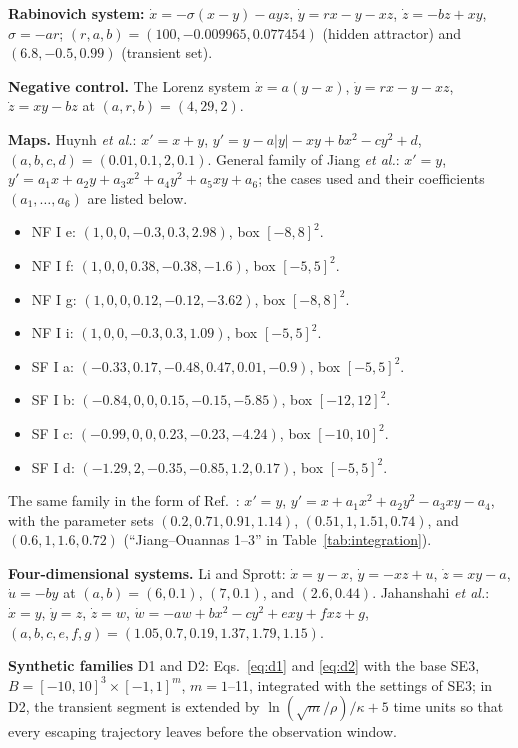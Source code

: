 \textbf{Rabinovich system:}\cite{Kuznetsov2018Rabinovich} $\dot x=-\sigma(x-y)-ayz$, $\dot y=rx-y-xz$, $\dot z=-bz+xy$, $\sigma=-ar$; $(r,a,b)=(100,-0.009965,0.077454)$ (hidden attractor) and $(6.8,-0.5,0.99)$ (transient set\cite{SprottMunmuangsaen2018Comment}).

\textbf{Negative control.} The Lorenz system $\dot x=a(y-x)$, $\dot y=rx-y-xz$, $\dot z=xy-bz$ at $(a,r,b)=(4,29,2)$.

\textbf{Maps.} Huynh \textit{et al.}:\cite{Huynh2019} $x'=x+y$, $y'=y-a|y|-xy+bx^2-cy^2+d$, $(a,b,c,d)=(0.01,0.1,2,0.1)$. General family of Jiang \textit{et al.}:\cite{Jiang2016Maps} $x'=y$, $y'=a_1x+a_2y+a_3x^2+a_4y^2+a_5xy+a_6$; the cases used and their coefficients $(a_1,\dots,a_6)$ are listed below.
\begin{itemize}
\item NF I e: $(1,0,0,-0.3,0.3,2.98)$, box $[-8,8]^2$.
\item NF I f: $(1,0,0,0.38,-0.38,-1.6)$, box $[-5,5]^2$.
\item NF I g: $(1,0,0,0.12,-0.12,-3.62)$, box $[-8,8]^2$.
\item NF I i: $(1,0,0,-0.3,0.3,1.09)$, box $[-5,5]^2$.
\item SF I a: $(-0.33,0.17,-0.48,0.47,0.01,-0.9)$, box $[-5,5]^2$.
\item SF I b: $(-0.84,0,0,0.15,-0.15,-5.85)$, box $[-12,12]^2$.
\item SF I c: $(-0.99,0,0,0.23,-0.23,-4.24)$, box $[-10,10]^2$.
\item SF I d: $(-1.29,2,-0.35,-0.85,1.2,0.17)$, box $[-5,5]^2$.
\end{itemize}
The same family in the form of Ref.~: $x'=y$, $y'=x+a_1x^2+a_2y^2-a_3xy-a_4$, with the parameter sets $(0.2,0.71,0.91,1.14)$, $(0.51,1,1.51,0.74)$, and $(0.6,1,1.6,0.72)$ (``Jiang--Ouannas 1--3'' in Table~\ref{tab:integration}).

\textbf{Four-dimensional systems.} Li and Sprott:\cite{LiSprott2014} $\dot x=y-x$, $\dot y=-xz+u$, $\dot z=xy-a$, $\dot u=-by$ at $(a,b)=(6,0.1)$, $(7,0.1)$, and $(2.6,0.44)$. Jahanshahi \textit{et al.}:\cite{Jahanshahi2019} $\dot x=y$, $\dot y=z$, $\dot z=w$, $\dot w=-aw+bx^2-cy^2+exy+fxz+g$, $(a,b,c,e,f,g)=(1.05,0.7,0.19,1.37,1.79,1.15)$.

\textbf{Synthetic families} D1 and D2: Eqs.~\eqref{eq:d1} and \eqref{eq:d2} with the base SE3, $B=[-10,10]^3\times[-1,1]^m$, $m=1$--11, integrated with the settings of SE3; in D2, the transient segment is extended by $\ln(\sqrt m/\rho)/\kappa+5$ time units so that every escaping trajectory leaves before the observation window.


